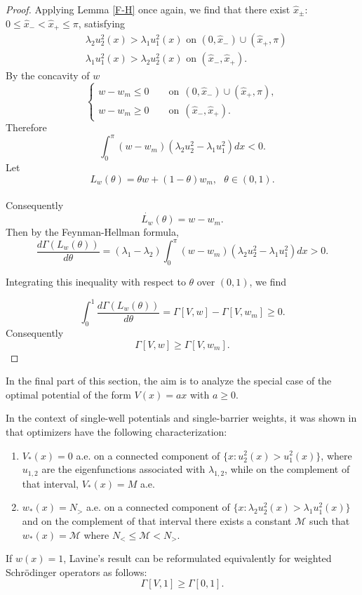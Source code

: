 \documentclass[12pt,a4paper]{amsart}
\begin{document}
\begin{proof}
Applying Lemma \ref{F-H} once again, we find that 
there exist $\widehat{x}_{\pm}$: $0\leqslant \widehat{x}_{-}<\widehat{x}_{+}\leqslant \pi$, satisfying 
\begin{align*}
    &\lambda_{2} u_{2}^{2}(x)>\lambda_{1} u_{1}^{2}(x) \textrm{ on } (0,\widehat{x}_{-})\cup (\widehat{x}_{+},\pi)\\
    &\lambda_{1}u_{1}^{2}(x)>\lambda_{2}u_{2}^{2}(x) \textrm{ on } (\widehat{x}_{-},\widehat{x}_{+}).
\end{align*}
\noindent By the concavity of $w$  
  $$\displaystyle  \left\{%
    \begin{array}{ll}
   
   w-w_{m} \leqslant  0 \qquad\text{on}~~(0,\widehat{x}_{-})\cup (\widehat{x}_{+},\pi),
   \\
    w-w_{m}\geqslant 0 \qquad\text{on}~~(\widehat{x}_{-},\widehat{x}_{+}).                                                                                      \end{array}                                                                                \right.$$
Therefore
$$
\int_{0}^{\pi}(w-w_{m})(\lambda_2 u_{2}^{2}-\lambda_1 u_{1}^{2})dx <0.
$$ Let 
 $$ L_w(\theta)=\theta w+(1-\theta)w_{m} , ~~~ \theta\in(0,1).$$\\
Consequently
 $$\dot{L_{w}}(\theta)=w-w_{m}.  $$
 Then by the Feynman-Hellman formula,
$$\frac{d\Gamma(L_w(\theta))}{d\theta}=(\lambda_1-\lambda_2)
\int_{0}^{\pi}(w-w_{m})(\lambda_2 u_{2}^{2}-\lambda_1 u_{1}^{2})dx >0.
$$

\noindent Integrating this inequality with respect to $\theta$ over $(0,1)$, we find

$$
\int_{0}^{1}\dfrac{d\Gamma(L_w(\theta))}{d\theta}=\Gamma[V,w]-\Gamma[V,w_{m}]\geqslant 0.
$$
Consequently
$$
\Gamma[V,w]\geqslant \Gamma[V,w_m].
$$

\end{proof}

 In the final part of this section, the aim is to analyze the special case of the optimal potential of the form $V(x)=ax$ with $a\geq0.$ 

\noindent  In the context of single-well potentials and single-barrier weights, it was shown in \cite{AHRA} that optimizers have the following
characterization:
\begin{enumerate}
\item
$V_{*}(x) = 0$ a.e. on a
connected component of $\{x: u_2^2(x) > u_1^2(x)\}$, where
$u_{1,2}$ are the eigenfunctions associated with 
$\lambda_{1,2}$, while on the complement of that interval, 
$V_{*}(x) = M$ 
a.e.  
\item
$w_{*}(x) = N_>$ a.e. on a
connected component of $\{x: \lambda_2 u_2^2(x) > \lambda_1 u_1^2(x)\}$ and on the complement of that interval there exists a constant $\mathcal{M}$ such that $w_{*}(x) = \mathcal{M}$ where $N_< \leq \mathcal{M}<N_>$. 
\end{enumerate}
If $w(x)=1$, Lavine’s \cite{Lavine} result can be reformulated equivalently for weighted Schr\"{o}dinger operators as follows: $$
\Gamma[V,1]\geqslant \Gamma[0,1].
$$
\end{document}
